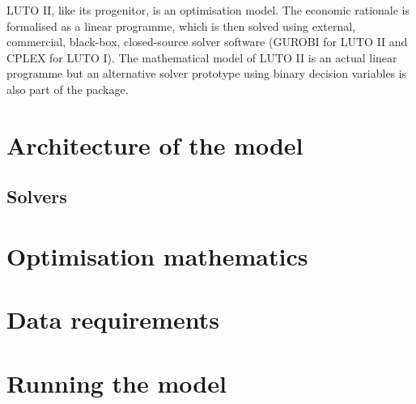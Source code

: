 \documentclass{draft}
\begin{document}
LUTO II, like its progenitor, is an optimisation model. The economic rationale is formalised as a linear programme, which is then solved using external, commercial, black-box, closed-source solver software (GUROBI for LUTO II and CPLEX for LUTO I). The mathematical model of LUTO II is an actual linear programme but an alternative solver prototype using binary decision variables is also part of the package.



\section{Architecture of the model}

\subsection{Solvers}\label{subsec:solvers}

\section{Optimisation mathematics}\label{sec:mathematics}

\section{Data requirements}

\section{Running the model}
\end{document}
